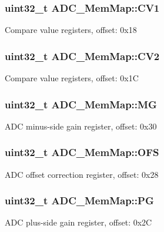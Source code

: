 \subsubsection[{C\+V1}]{\setlength{\rightskip}{0pt plus 5cm}uint32\+\_\+t A\+D\+C\+\_\+\+Mem\+Map\+::\+C\+V1}\label{struct_a_d_c___mem_map_af687bec25a698b31731350c05cd5ba05}
Compare value registers, offset\+: 0x18 \hypertarget{struct_a_d_c___mem_map_acf6745fccc765451358e179f7131e645}{}
\subsubsection[{C\+V2}]{\setlength{\rightskip}{0pt plus 5cm}uint32\+\_\+t A\+D\+C\+\_\+\+Mem\+Map\+::\+C\+V2}\label{struct_a_d_c___mem_map_acf6745fccc765451358e179f7131e645}
Compare value registers, offset\+: 0x1\+C \hypertarget{struct_a_d_c___mem_map_ae615bad0b39c73a03fdebeb83f4beb91}{}
\subsubsection[{M\+G}]{\setlength{\rightskip}{0pt plus 5cm}uint32\+\_\+t A\+D\+C\+\_\+\+Mem\+Map\+::\+M\+G}\label{struct_a_d_c___mem_map_ae615bad0b39c73a03fdebeb83f4beb91}
A\+D\+C minus-\/side gain register, offset\+: 0x30 \hypertarget{struct_a_d_c___mem_map_a89e51c569b4a0e4298bc4524afabb594}{}
\subsubsection[{O\+F\+S}]{\setlength{\rightskip}{0pt plus 5cm}uint32\+\_\+t A\+D\+C\+\_\+\+Mem\+Map\+::\+O\+F\+S}\label{struct_a_d_c___mem_map_a89e51c569b4a0e4298bc4524afabb594}
A\+D\+C offset correction register, offset\+: 0x28 \hypertarget{struct_a_d_c___mem_map_aa63b6cd61d17dda7d69bdc02c7f5204a}{}
\subsubsection[{P\+G}]{\setlength{\rightskip}{0pt plus 5cm}uint32\+\_\+t A\+D\+C\+\_\+\+Mem\+Map\+::\+P\+G}\label{struct_a_d_c___mem_map_aa63b6cd61d17dda7d69bdc02c7f5204a}
A\+D\+C plus-\/side gain register, offset\+: 0x2\+C \hypertarget{struct_a_d_c___mem_map_a3c43d657acb03daee1a6abbb58206a56}{}
